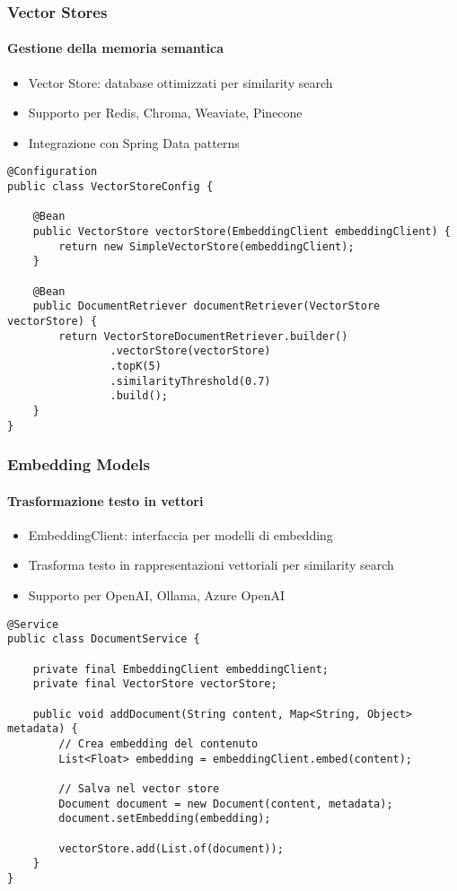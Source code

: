 \begin{frame}[t,fragile] \frametitle{Vector Stores}
	{\small
		\framesubtitle{Gestione della memoria semantica}
		\begin{itemize}[leftmargin=10pt,align=right]
			\onslide<2->\item[\alert{\faArrowCircleRight}] \alert{Vector Store:} database ottimizzati per similarity search
			\onslide<3->\item[\alert{\faArrowCircleRight}] Supporto per \alert{Redis}, \alert{Chroma}, \alert{Weaviate}, \alert{Pinecone}
			\onslide<4->\item[\alert{\faArrowCircleRight}] Integrazione con \alert{Spring Data} patterns
		\end{itemize}
		\vspace*{.3cm}
\begin{verbatim}
@Configuration
public class VectorStoreConfig {
    
    @Bean
    public VectorStore vectorStore(EmbeddingClient embeddingClient) {
        return new SimpleVectorStore(embeddingClient);
    }
    
    @Bean 
    public DocumentRetriever documentRetriever(VectorStore vectorStore) {
        return VectorStoreDocumentRetriever.builder()
                .vectorStore(vectorStore)
                .topK(5)
                .similarityThreshold(0.7)
                .build();
    }
}
\end{verbatim}
	}
\end{frame}
%
\begin{frame}[t,fragile] \frametitle{Embedding Models}
	{\small
		\framesubtitle{Trasformazione testo in vettori}
		\begin{itemize}[leftmargin=10pt,align=right]
			\onslide<2->\item[\alert{\faArrowCircleRight}] \alert{EmbeddingClient:} interfaccia per modelli di embedding
			\onslide<3->\item[\alert{\faArrowCircleRight}] Trasforma testo in \alert{rappresentazioni vettoriali} per similarity search
			\onslide<4->\item[\alert{\faArrowCircleRight}] Supporto per \alert{OpenAI}, \alert{Ollama}, \alert{Azure OpenAI}
		\end{itemize}
		\vspace*{.3cm}
\begin{verbatim}
@Service
public class DocumentService {
    
    private final EmbeddingClient embeddingClient;
    private final VectorStore vectorStore;
    
    public void addDocument(String content, Map<String, Object> metadata) {
        // Crea embedding del contenuto
        List<Float> embedding = embeddingClient.embed(content);
        
        // Salva nel vector store
        Document document = new Document(content, metadata);
        document.setEmbedding(embedding);
        
        vectorStore.add(List.of(document));
    }
}
\end{verbatim}
	}
\end{frame}
%
